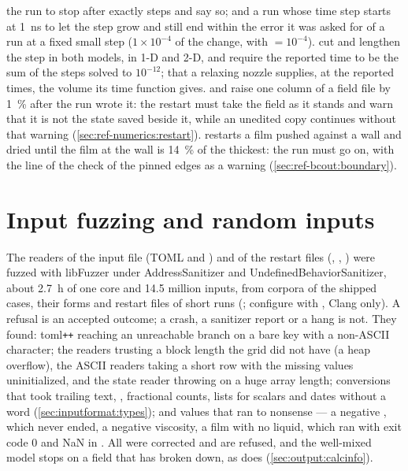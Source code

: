  the run to stop after exactly  steps and say so;
and  a run whose time step starts at \SI{1}{\nano\second}
to let the step grow and still end within the error it was asked for of a run
at a fixed small step ($1\times10^{-4}$ of the change, with
 $=10^{-4}$).  cut and lengthen the step in both models,
in 1-D and 2-D, and require the reported time to be the sum of the steps
solved to $10^{-12}$;  that a relaxing nozzle supplies,
at the reported times, the volume its time function gives.
 and  raise one column of
a field file by \SI{1}{\percent} after the run wrote it: the restart must take
the field as it stands and warn that it is not the state saved beside it,
while an unedited copy continues without that warning
(\cref{sec:ref-numerics:restart}).  restarts a film
pushed against a  wall and dried until the film at the wall is
\SI{14}{\percent} of the thickest: the run must go on, with the line of the
check of the pinned edges as a warning (\cref{sec:ref-bcout:boundary}).

\section{Input fuzzing and random inputs}
\label{sec:verification:fuzzing}

The readers of the input file (TOML and ) and of the restart files
(, , ) were fuzzed with
libFuzzer under AddressSanitizer and UndefinedBehaviorSanitizer, about
\SI{2.7}{\hour} of one core and 14.5 million inputs, from corpora of the
shipped cases, their  forms and restart files of short runs
(; configure with ,
Clang only). A refusal is an accepted outcome; a crash, a sanitizer report or
a hang is not. They found: toml\texttt{++} reaching an unreachable branch on
a bare key with a non-ASCII character; the  readers trusting a
block length the grid did not have (a heap overflow), the ASCII readers
taking a short row with the missing values uninitialized, and the state
reader throwing on a huge array length; conversions that took trailing text,
, fractional counts, lists for scalars and dates without a word
(\cref{sec:inputformat:types}); and values that ran to nonsense --- a
negative , which never ended, a negative viscosity, a film
with no liquid, which ran with exit code 0 and NaN in .
All were corrected and are refused, and the well-mixed model stops on a
field that has broken down, as  does (\cref{sec:output:calcinfo}).

